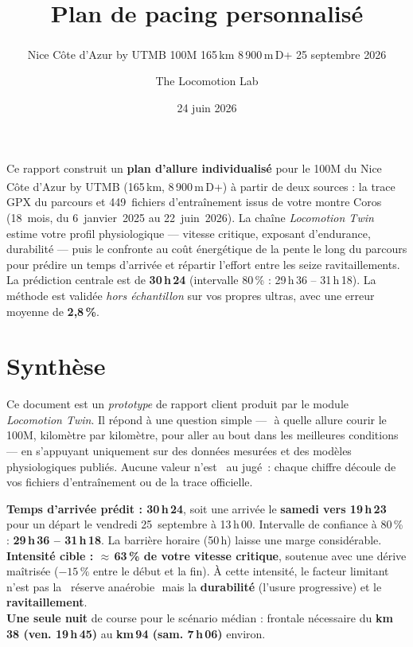 \documentclass{locomotionreport}
\title{Plan de pacing personnalis\'e}
\subtitle{Nice C\^ote d'Azur by UTMB\textsuperscript{\textregistered} \textperiodcentered{} 100M \textperiodcentered{} 165\,km \textperiodcentered{} 8\,900\,m\,D+ \textperiodcentered{} 25 septembre 2026}
\author{The Locomotion Lab}
\date{24 juin 2026}
\begin{document}
\makecover

\begin{llabstract}
Ce rapport construit un \textbf{plan d'allure individualis\'e} pour le 100M du Nice C\^ote d'Azur by UTMB\textsuperscript{\textregistered}
(165\,km, 8\,900\,m\,D+) \`a partir de deux sources : la trace GPX du parcours et 449~fichiers d'entra\^inement issus
de votre montre Coros (18~mois, du 6~janvier~2025 au 22~juin~2026). La cha\^ine \emph{Locomotion Twin} estime votre
profil physiologique --- vitesse critique, exposant d'endurance, durabilit\'e --- puis le confronte au co\^ut \'energ\'etique
de la pente le long du parcours pour pr\'edire un temps d'arriv\'ee et r\'epartir l'effort entre les seize ravitaillements.
La pr\'ediction centrale est de \textbf{30\,h\,24} (intervalle 80\,\% : 29\,h\,36 -- 31\,h\,18). La m\'ethode est valid\'ee
\emph{hors \'echantillon} sur vos propres ultras, avec une erreur moyenne de \textbf{2,8\,\%}.
\end{llabstract}

\LLtoc
\clearpage

\section{Synth\`ese}

Ce document est un \emph{prototype} de rapport client produit par le module \emph{Locomotion Twin}. Il r\'epond \`a une
question simple --- \,\guillemotleft\,\`a quelle allure courir le 100M, kilom\`etre par kilom\`etre, pour aller au bout
dans les meilleures conditions\,\guillemotright\, --- en s'appuyant uniquement sur des donn\'ees mesur\'ees et des
mod\`eles physiologiques publi\'es. Aucune valeur n'est \og~au jug\'e~\fg : chaque chiffre d\'ecoule de vos fichiers
d'entra\^inement ou de la trace officielle.

\begin{llnote}[L'essentiel]
\textbf{Temps d'arriv\'ee pr\'edit : 30\,h\,24}, soit une arriv\'ee le \textbf{samedi vers 19\,h\,23} pour un d\'epart
le vendredi 25~septembre \`a 13\,h\,00. Intervalle de confiance \`a 80\,\% : \textbf{29\,h\,36 -- 31\,h\,18}.
La barri\`ere horaire (50\,h) laisse une marge consid\'erable.
\\[2pt]
\textbf{Intensit\'e cible : $\approx$\,63\,\% de votre vitesse critique}, soutenue avec une d\'erive ma\^itris\'ee
($-15\,\%$ entre le d\'ebut et la fin). \`A cette intensit\'e, le facteur limitant n'est pas la \og~r\'eserve
ana\'erobie\,\fg\ mais la \textbf{durabilit\'e} (l'usure progressive) et le \textbf{ravitaillement}.
\\[2pt]
\textbf{Une seule nuit} de course pour le sc\'enario m\'edian : frontale n\'ecessaire du \textbf{km\,38 (ven. 19\,h\,45)}
au \textbf{km\,94 (sam. 7\,h\,06)} environ.
\end{llnote}
\end{document}
